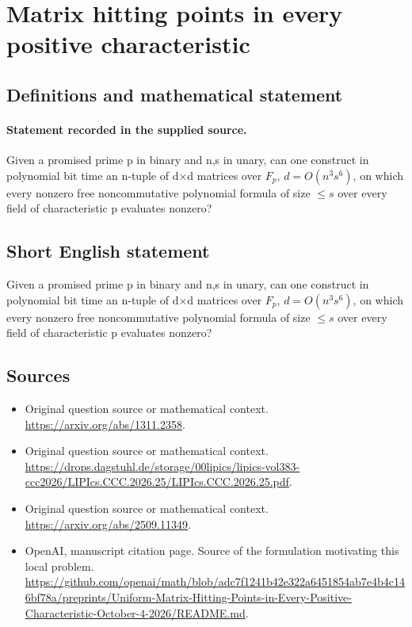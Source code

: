 \documentclass[11pt]{article}
\begin{document}
\section*{Matrix hitting points in every positive characteristic}\label{statement}
\subsection{Definitions and mathematical statement}
\paragraph{Statement recorded in the supplied source.}
Given a promised prime p in binary and n,s in unary, can one construct in polynomial bit time an n-tuple of d×d matrices over $F_p$, $d=O(n^{3}s^{6})$, on which every nonzero free noncommutative polynomial formula of size $\leq s$ over every field of characteristic p evaluates nonzero?
\subsection{Short English statement}
Given a promised prime p in binary and n,s in unary, can one construct in polynomial bit time an n-tuple of d×d matrices over $F_p$, $d=O(n^{3}s^{6})$, on which every nonzero free noncommutative polynomial formula of size $\leq s$ over every field of characteristic p evaluates nonzero?
\subsection{Sources}
\begin{itemize}
\item[S1] Original question source or mathematical context.
\url{https://arxiv.org/abs/1311.2358}.
\item[S2] Original question source or mathematical context.
\url{https://drops.dagstuhl.de/storage/00lipics/lipics-vol383-ccc2026/LIPIcs.CCC.2026.25/LIPIcs.CCC.2026.25.pdf}.
\item[S3] Original question source or mathematical context.
\url{https://arxiv.org/abs/2509.11349}.
\item[S4] OpenAI, manuscript citation page. Source of the formulation motivating this local problem.
\url{https://github.com/openai/math/blob/adc7f1241b42e322a6451854ab7e4b4c146bf78a/preprints/Uniform-Matrix-Hitting-Points-in-Every-Positive-Characteristic-October-4-2026/README.md}.
\end{itemize}
\end{document}
